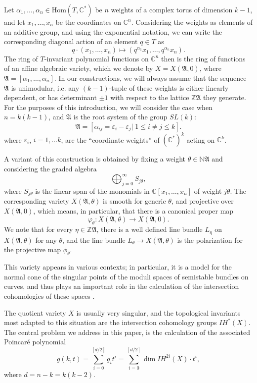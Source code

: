 \documentclass[11pt]{article}
\theoremstyle{definition}
\numberwithin{equation}{section}
\newcommand{\A}{\mathfrak{A}}
\newcommand{\C}{\mathbb{C}}
\begin{document}
Let $ 
\alpha_1,\dots,\alpha_n\in\mathrm{Hom}(T,\C^*) $ be $ n $ weights of a complex 
torus of dimension $ k-1 $, and let $ x_1, \ldots, x_n $ be the  coordinates 
on $ \C^n $. Considering the weights as elements of an additive group, and 
using the exponential notation, we can write the corresponding diagonal action 
of an element $ q\in T $ as
\[    q\cdot (x_1,\dots, x_n)  \mapsto ( q^{\alpha_1}x_1,\dots,q^{\alpha_n} 
x_n).
 \]
The ring of $ T $-invariant polynomial functions on $ \C^n $ then is the ring 
of functions of an affine algebraic variety, which we denote by $X=X(\A,0)$, 
where  $ \A=[\alpha_1,\dots,\alpha_n ]$. 
In our constructions, we will always assume that the sequence
$ \A$ is unimodular, i.e.  any $ (k-1) $-tuple of these 
weights is either linearly dependent, or has determinant $ \pm1 $ with respect 
to the lattice $\mathbb{Z}\A$ they generate. For the purposes of this introduction, 
we will consider the case when $ n= k(k-1) $, and $ \A $ is the root system of 
the group $ SL(k) $:
\[ \A = [ \alpha_{ij}=\varepsilon_i - \varepsilon_j|\; 1\le i\neq j\le k ]. 
\]
where $ \varepsilon_i $, $ i=1,\dots k $, are the ``coordinate weights'' of 
$ (\C^*)^k $ acting on $ \C^k$. 

A variant of this construction is obtained by fixing a weight $ \theta\in\mathbb{N}\A
$ and considering the graded algebra 
\[    \bigoplus_{j=0}^\infty S_{j\theta}, \]
where $  S_{j\theta}$ is the linear span of the monomials in $\C 
[x_1,\ldots, x_n] $ of weight $ j\theta $. The corresponding variety $ 
X(\A,\theta) $ is smooth for generic $ \theta $, and projective over ${X}(\A,0)$, 
which means, in particular, that there is a canonical proper map 
$$ \varphi_\theta:X(\A,\theta) \to X(\A,0).$$ We note that for every $ 
\eta\in\mathbb{Z}\A  $, 
there is a well defined line bundle $ L_\eta $ on $ X(\A,\theta) $ for any $ 
\theta$, and  the line bundle 
$ L_\theta\to X(\A,\theta) $ is the polarization for the projective map $ \phi_\theta $.


This variety appears in various contexts; in particular, it is a model for the 
normal cone of the singular points
of the moduli spaces of semistable bundles on curves, and thus plays an
important role in the calculation of the intersection cohomologies of these 
spaces \cite{MeinRein, MozgovoyRein, cfotasz}.


The quotient variety $ X $ is usually very singular, and the topological 
invariants most adapted to this situation are the intersection cohomology 
groups $ IH^*(X) $.  The central problem we address in this paper, is 
the calculation of the associated Poincar\'e polynomial 
\[   g(k,t)=  \sum_{i=0}^{[d/2]}g_it^i =  \sum_{i=0}^{[d/2]} \dim IH^{2i}(X)\cdot t^i, \]
where $d=n-k=k(k-2)$.
\end{document}
